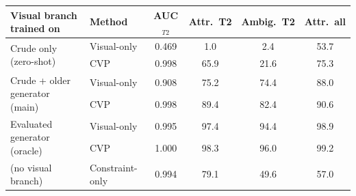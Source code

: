 \begin{tabular}{llcccc}
\toprule
Visual branch trained on & Method & AUC$_{T2}$ & Attr.\ T2 & Ambig.\ T2 & Attr.\ all\\
\midrule
\multirow{2}{*}{Crude only (zero-shot)} & Visual-only & 0.469 & 1.0 & 2.4 & 53.7\\
 & CVP & 0.998 & 65.9 & 21.6 & 75.3\\
\midrule
\multirow{2}{*}{Crude + older generator (main)} & Visual-only & 0.908 & 75.2 & 74.4 & 88.0\\
 & CVP & 0.998 & 89.4 & 82.4 & 90.6\\
\midrule
\multirow{2}{*}{Evaluated generator (oracle)} & Visual-only & 0.995 & 97.4 & 94.4 & 98.9\\
 & CVP & 1.000 & 98.3 & 96.0 & 99.2\\
\midrule
(no visual branch) & Constraint-only & 0.994 & 79.1 & 49.6 & 57.0\\
\bottomrule
\end{tabular}
